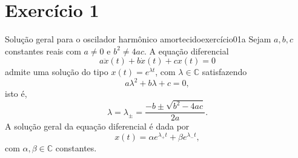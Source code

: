 \section*{Exercício 1}
\begin{proposition}{Solução geral para o oscilador harmônico amortecido}{exercício01a}
    Sejam \(a, b, c\) constantes reais com \(a \neq 0\) e \(b^2 \neq 4ac\). A equação diferencial
    \begin{equation*}
        a \ddot{x}(t) + b \dot{x}(t) + cx(t) = 0
    \end{equation*}
    admite uma solução do tipo \(x(t) = e^{\lambda t}\), com \(\lambda \in \mathbb{C}\) satisfazendo
    \begin{equation*}
        a\lambda^2 + b \lambda + c = 0,
    \end{equation*}
    isto é,
    \begin{equation*}
        \lambda = \lambda_\pm = \frac{-b \pm \sqrt{b^2 - 4ac}}{2a}.
    \end{equation*}
    A solução geral da equação diferencial é dada por
    \begin{equation*}
        x(t) = \alpha e^{\lambda_+t} + \beta e^{\lambda_-t},
    \end{equation*}
    com \(\alpha, \beta \in \mathbb{C}\) constantes.
\end{proposition}
